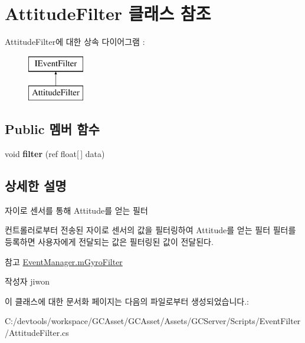 \hypertarget{class_attitude_filter}{}\section{Attitude\+Filter 클래스 참조}
\label{class_attitude_filter}
Attitude\+Filter에 대한 상속 다이어그램 \+: \begin{figure}[H]
\begin{center}
\leavevmode
\includegraphics[height=2.000000cm]{class_attitude_filter}
\end{center}
\end{figure}
\subsection*{Public 멤버 함수}
\begin{DoxyCompactItemize}
\item 
\hypertarget{class_attitude_filter_a91c49319cb969aae2a5b28948eeac963}{}void {\bfseries filter} (ref float\mbox{[}$\,$\mbox{]} data)\label{class_attitude_filter_a91c49319cb969aae2a5b28948eeac963}

\end{DoxyCompactItemize}


\subsection{상세한 설명}
자이로 센서를 통해 Attitude를 얻는 필터

컨트롤러로부터 전송된 자이로 센서의 값을 필터링하여 Attitude를 얻는 필터 필터를 등록하면 사용자에게 전달되는 값은 필터링된 값이 전달된다. \begin{DoxySeeAlso}{참고}
\hyperlink{class_event_manager_a7cee85488f5d7220c102cd945b1f494a}{Event\+Manager.\+m\+Gyro\+Filter} 
\end{DoxySeeAlso}
\begin{DoxyAuthor}{작성자}
jiwon 
\end{DoxyAuthor}


이 클래스에 대한 문서화 페이지는 다음의 파일로부터 생성되었습니다.\+:\begin{DoxyCompactItemize}
\item 
C\+:/devtools/workspace/\+G\+C\+Asset/\+G\+C\+Asset/\+Assets/\+G\+C\+Server/\+Scripts/\+Event\+Filter/Attitude\+Filter.\+cs\end{DoxyCompactItemize}
